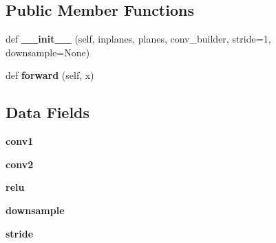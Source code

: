 \subsection*{Public Member Functions}
\begin{DoxyCompactItemize}
\item 
\mbox{\label{classtorchvision_1_1models_1_1video_1_1resnet_1_1BasicBlock_aeab8c9f6c07d72bf7aeb9682688ad68d}} 
def {\bfseries \+\_\+\+\_\+init\+\_\+\+\_\+} (self, inplanes, planes, conv\+\_\+builder, stride=1, downsample=None)
\item 
\mbox{\label{classtorchvision_1_1models_1_1video_1_1resnet_1_1BasicBlock_a87ee43bb0854459cdd2b6041c975b86c}} 
def {\bfseries forward} (self, x)
\end{DoxyCompactItemize}
\subsection*{Data Fields}
\begin{DoxyCompactItemize}
\item 
\mbox{\label{classtorchvision_1_1models_1_1video_1_1resnet_1_1BasicBlock_ab40bbe234d5ad5095c225c9615dc116a}} 
{\bfseries conv1}
\item 
\mbox{\label{classtorchvision_1_1models_1_1video_1_1resnet_1_1BasicBlock_a534381f344c35d0ce752306f096a19ca}} 
{\bfseries conv2}
\item 
\mbox{\label{classtorchvision_1_1models_1_1video_1_1resnet_1_1BasicBlock_a8f310312a129b7ddb5198799cca7dc84}} 
{\bfseries relu}
\item 
\mbox{\label{classtorchvision_1_1models_1_1video_1_1resnet_1_1BasicBlock_aa67c9a516a193bed68076da8e3b7b28d}} 
{\bfseries downsample}
\item 
\mbox{\label{classtorchvision_1_1models_1_1video_1_1resnet_1_1BasicBlock_a41395c84c0812d7bb533629e2e953557}} 
{\bfseries stride}
\end{DoxyCompactItemize}
